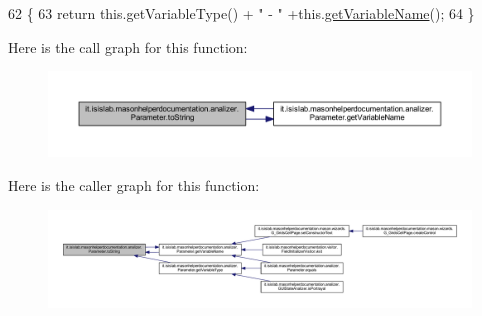 \begin{DoxyCode}
62                             \{
63         \textcolor{keywordflow}{return} this.getVariableType() + \textcolor{stringliteral}{" - "} +this.\hyperlink{classit_1_1isislab_1_1masonhelperdocumentation_1_1analizer_1_1_parameter_a90a9a8c551b6aa3b5a7502f6598ca4ef}{getVariableName}();
64     \}
\end{DoxyCode}


Here is the call graph for this function\-:
\nopagebreak
\begin{figure}[H]
\begin{center}
\leavevmode
\includegraphics[width=350pt]{classit_1_1isislab_1_1masonhelperdocumentation_1_1analizer_1_1_parameter_a160bdfaa76ebdd6345cad2c751ffa834_cgraph}
\end{center}
\end{figure}




Here is the caller graph for this function\-:
\nopagebreak
\begin{figure}[H]
\begin{center}
\leavevmode
\includegraphics[width=350pt]{classit_1_1isislab_1_1masonhelperdocumentation_1_1analizer_1_1_parameter_a160bdfaa76ebdd6345cad2c751ffa834_icgraph}
\end{center}
\end{figure}




